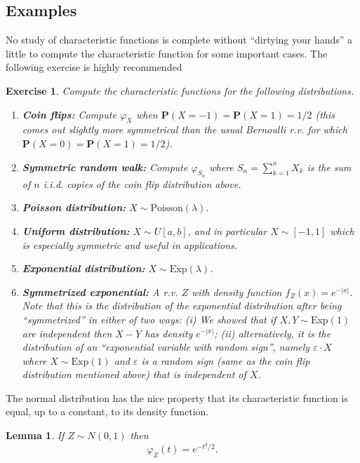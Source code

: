 \documentclass[12pt]{article}
\newtheorem{lem}[thm]{Lemma}
\newtheorem{exercise}[thm]{Exercise}
\newcommand{\prob}{\mathbf{P}}
\theoremstyle{example}
\begin{document}
\subsection{Examples}

No study of characteristic functions is complete without ``dirtying your hands'' a little to compute the characteristic function for some important cases. The following exercise is highly recommended

\begin{exercise} Compute the characteristic functions for the following distributions.
\begin{enumerate}
\item \textbf{Coin flips:} Compute $\varphi_X$ when $\prob(X=-1)=\prob(X=1)=1/2$ (this comes out slightly more symmetrical than the usual Bernoulli r.v. for which $\prob(X=0)=\prob(X=1)=1/2$).
\item \textbf{Symmetric random walk:} Compute $\varphi_{S_n}$ where $S_n=\sum_{k=1}^n X_k$ is the sum of $n$ i.i.d. copies of the coin flip distribution above.
\item \textbf{Poisson distribution:} $X\sim \textrm{Poisson}(\lambda)$.
\item \textbf{Uniform distribution:} $X \sim U[a,b]$, and in particular $X\sim [-1,1]$ which is especially symmetric and useful in applications.
\item \textbf{Exponential distribution:} $X\sim \textrm{Exp}(\lambda)$.
\item \textbf{Symmetrized exponential:} A r.v. $Z$ with density function $f_Z(x) = e^{-|x|}$. Note that this is the distribution of the exponential distribution after being ``symmetrized'' in either of two ways: (i) We showed that if $X,Y\sim \textrm{Exp}(1)$ are independent then $X-Y$ has density $e^{-|x|}$; (ii) alternatively, it is the distribution of an ``exponential variable with random sign'', namely $\varepsilon\cdot X$ where $X\sim \textrm{Exp}(1)$ and $\varepsilon$ is a random sign (same as the coin flip distribution mentioned above) that is independent of $X$.
\end{enumerate}
\end{exercise}

The normal distribution has the nice property that its characteristic function is equal, up to a constant, to its density function.

\begin{lem} If $Z\sim N(0,1)$ then
$$ \varphi_Z(t) = e^{-t^2/2}. $$
\end{lem}
\end{document}
